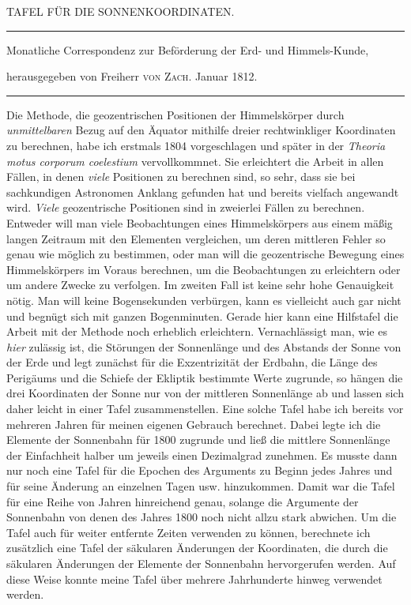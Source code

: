 \clearpage{}%
\begin{center}
{\small TAFEL FÜR DIE SONNENKOORDINATEN.\par}
\medskip\hrule\medskip
{\small Monatliche Correspondenz zur Beförderung der Erd- und Himmels-Kunde,\par
herausgegeben von Freiherr \textsc{von Zach}. Januar 1812.\par}
\medskip\hrule
\end{center}\medskip
Die Methode, die geozentrischen Positionen der Himmelskörper durch \emph{unmittelbaren} Bezug auf den Äquator mithilfe dreier rechtwinkliger Koordinaten zu berechnen, habe ich erstmals 1804 vorgeschlagen und später in der \emph{Theoria motus corporum coelestium} vervollkommnet. Sie erleichtert die Arbeit in allen Fällen, in denen \emph{viele} Positionen zu berechnen sind, so sehr, dass sie bei sachkundigen Astronomen Anklang gefunden hat und bereits vielfach angewandt wird. \emph{Viele} geozentrische Positionen sind in zweierlei Fällen zu berechnen. Entweder will man viele Beobachtungen eines Himmelskörpers aus einem mäßig langen Zeitraum mit den Elementen vergleichen, um deren mittleren Fehler so genau wie möglich zu bestimmen, oder man will die geozentrische Bewegung eines Himmelskörpers im Voraus berechnen, um die Beobachtungen zu erleichtern oder um andere Zwecke zu verfolgen. Im zweiten Fall ist keine sehr hohe Genauigkeit nötig. Man will keine Bogensekunden verbürgen, kann es vielleicht auch gar nicht und begnügt sich mit ganzen Bogenminuten. Gerade hier kann eine Hilfstafel die Arbeit mit der Methode noch erheblich erleichtern. Vernachlässigt man, wie es \emph{hier} zulässig ist, die Störungen der Sonnenlänge und des Abstands der Sonne von der Erde und legt zunächst für die Exzentrizität der Erdbahn, die Länge des Perigäums und die Schiefe der Ekliptik
%
bestimmte Werte zugrunde, so hängen die drei Koordinaten der Sonne nur von der mittleren Sonnenlänge ab und lassen sich daher leicht in einer Tafel zusammenstellen. Eine solche Tafel habe ich bereits vor mehreren Jahren für meinen eigenen Gebrauch berechnet. Dabei legte ich die Elemente der Sonnenbahn für 1800 zugrunde und ließ die mittlere Sonnenlänge der Einfachheit halber um jeweils einen Dezimalgrad zunehmen. Es musste dann nur noch eine Tafel für die Epochen des Arguments zu Beginn jedes Jahres und für seine Änderung an einzelnen Tagen usw. hinzukommen. Damit war die Tafel für eine Reihe von Jahren hinreichend genau, solange die Argumente der Sonnenbahn von denen des Jahres 1800 noch nicht allzu stark abwichen. Um die Tafel auch für weiter entfernte Zeiten verwenden zu können, berechnete ich zusätzlich eine Tafel der säkularen Änderungen der Koordinaten, die durch die säkularen Änderungen der Elemente der Sonnenbahn hervorgerufen werden. Auf diese Weise konnte meine Tafel über mehrere Jahrhunderte hinweg verwendet werden.

